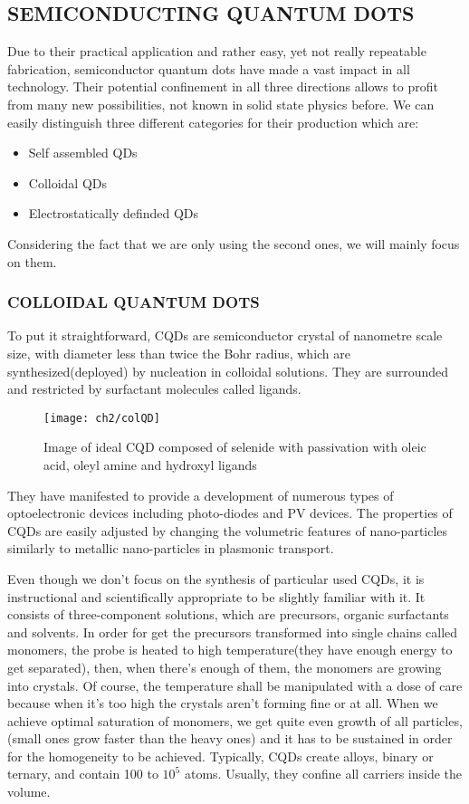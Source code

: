 \subsection{SEMICONDUCTING QUANTUM DOTS}

Due to their practical application and rather easy, yet not really repeatable fabrication, semiconductor quantum dots have made a vast impact in all technology. Their potential confinement in all three directions allows to profit from many new possibilities, not known in solid state physics before.
We can easily distinguish three different categories for their production which are:
\begin{itemize}
\item Self assembled QDs
\item Colloidal QDs
\item Electrostatically definded QDs 
\end{itemize}
Considering the fact that we are only using the second ones, we will mainly focus on them. 

\subsubsection{COLLOIDAL QUANTUM DOTS}
To put it straightforward, CQDs are semiconductor crystal of nanometre scale size, with diameter less than twice the Bohr radius, which are synthesized(deployed) by nucleation in colloidal solutions. They are surrounded and restricted by surfactant molecules called ligands. 

\begin{figure}[H]
\centering
\texttt{[image: ch2/colQD]}

\caption{Image of ideal CQD composed of selenide with passivation with oleic acid, oleyl amine and hydroxyl ligands \cite{qd}}
\end{figure}

\noindent They have manifested to provide a development of numerous types of optoelectronic devices including photo-diodes and PV devices. The properties of CQDs are easily adjusted by changing the volumetric features of nano-particles similarly to metallic nano-particles in plasmonic transport. \cite{Abdelhady2015} \cite{G.D.Scholes2003}

\noindent Even though we don't focus on the synthesis of particular used CQDs, it is instructional and scientifically appropriate to be slightly familiar with it. It consists of three-component solutions, which are precursors, organic surfactants and solvents. In order for get the precursors transformed into single chains called monomers, the probe is heated to high temperature(they have enough energy to get separated), then, when there's enough of them, the monomers are growing into crystals. Of course, the temperature shall be manipulated with a dose of care because when it's too high the crystals aren't forming fine or at all. When we achieve optimal saturation of monomers, we get quite even growth of all particles, (small ones grow faster than the heavy ones) and it has to be sustained in order for the homogeneity to be achieved.
Typically, CQDs create alloys, binary or ternary, and contain 100 to $10^5$ atoms. Usually, they confine all carriers inside the volume.

